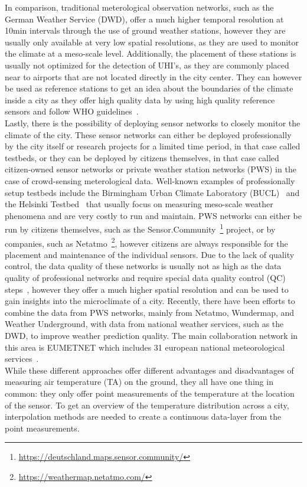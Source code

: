 In comparison, traditional meterological observation networks, such as the German Weather Service (DWD), offer a much higher temporal resolution at 10min intervals through the use of ground weather stations, however they are usually only available at very low spatial resolutions, as they are used to monitor the climate at a meso-scale level. Additionally, the placement of these stations is usually not optimized for the detection of UHI's, as they are commonly placed near to airports that are not located directly in the city center. They can however be used as reference stations to get an idea about the boundaries of the climate inside a city as they offer high quality data by using high quality reference sensors and follow WHO guidelines~\cite{oke2006guideline}.\\
Lastly, there is the possibility of deploying sensor networks to closely monitor the climate of the city. These sensor networks can either be deployed professionally by the city itself or research projects for a limited time period, in that case called testbeds, or they can be deployed by citizens themselves, in that case called citizen-owned sensor networks or private weather station networks (PWS) in the case of crowd-sensing meterological data. Well-known examples of professionally setup testbeds include the Birmingham Urban Climate Laboratory (BUCL)~\cite{chapman2015birmingham} and the Helsinki Testbed~\cite{koskinen2011helsinki} that usually focus on measuring meso-scale weather phenomena and are very costly to run and maintain.
PWS networks can either be run by citizens themselves, such as the Sensor.Community~\footnote{\url{https://deutschland.maps.sensor.community/}} project, or by companies, such as Netatmo~\footnote{\url{https://weathermap.netatmo.com/}}, however citizens are always responsible for the placement and maintenance of the individual sensors. Due to the lack of quality control, the data quality of these networks is usually not as high as the data quality of professional networks and require special data quality control (QC) steps~\cite{fenner2021crowdqc+, meier2017crowdsourcing}, however they offer a much higher spatial resolution and can be used to gain insights into the microclimate of a city. Recently, there have been efforts to combine the data from PWS networks, mainly from Netatmo, Wundermap, and Weather Underground, with data from national weather services, such as the DWD, to improve weather prediction quality. The main collaboration network in this area is EUMETNET which includes 31 european national meteorological services~\cite{hahn2022observations}.\\
While these different approaches offer different advantages and disadvantages of measuring air temperature (TA) on the ground, they all have one thing in common: they only offer point measurements of the temperature at the location of the sensor. To get an overview of the temperature distribution across a city, interpolation methods are needed to create a continuous data-layer from the point measurements.

